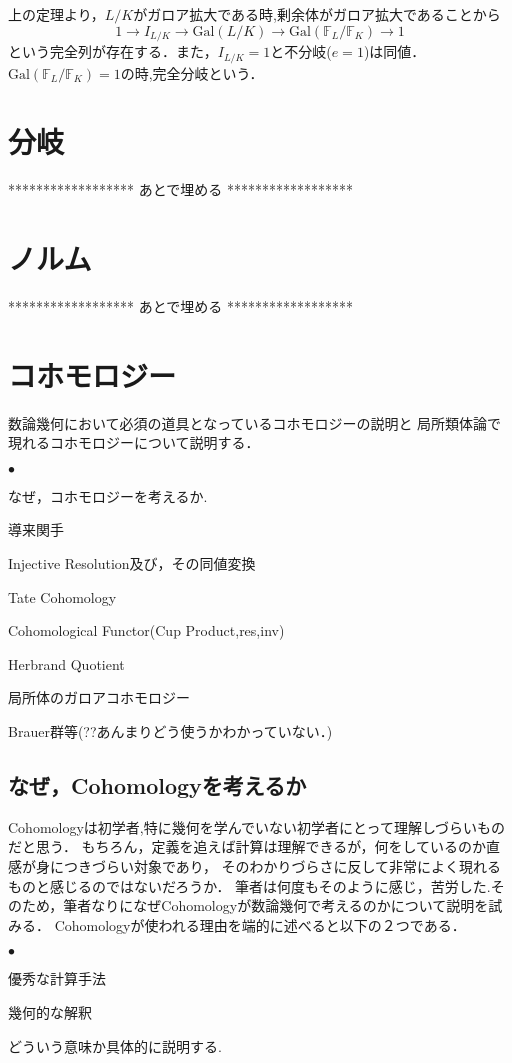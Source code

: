 \documentclass{ujarticle}
\renewenvironment{itemize}%
{%
   \begin{list}{\parbox{1zw}{$\bullet$}}%
   {%
      \setlength{\topsep}{0zh}
      \setlength{\itemindent}{0zw}
      \setlength{\leftmargin}{2zw}%
      \setlength{\rightmargin}{0zw}%
      \setlength{\labelsep}{1zw}%
      \setlength{\labelwidth}{3zw}%
      \setlength{\itemsep}{0em}%
      \setlength{\parsep}{0em}%
      \setlength{\listparindent}{0zw}%
   }
}{%
   \end{list}%
}
\begin{document}
上の定理より，$L/K$がガロア拡大である時,剰余体がガロア拡大であることから
\begin{equation}
  1 \to I_{L/K} \to \mathrm{Gal}(L/K) \to \mathrm{Gal}(\mathbb{F}_L/\mathbb{F}_K) \to 1
\end{equation}
という完全列が存在する．また，$I_{L/K}=1$と不分岐($e = 1$)は同値．
$\mathrm{Gal}(\mathbb{F}_L/\mathbb{F}_K) =1$の時,完全分岐という．

\section{分岐}
\label{sec:分岐}
******************
 あとで埋める
******************
\section{ノルム}
\label{sec:ノルム}
******************
 あとで埋める
******************


\section{コホモロジー}
\label{sec:コホモロジー}
数論幾何において必須の道具となっているコホモロジーの説明と
局所類体論で現れるコホモロジーについて説明する．
\begin{itemize}
  \item なぜ，コホモロジーを考えるか.
  \item 導来関手
  \item Injective Resolution及び，その同値変換
  \item Tate Cohomology
  \item Cohomological Functor(Cup Product,res,inv)
  \item Herbrand Quotient
  \item 局所体のガロアコホモロジー
  \item Brauer群等(??あんまりどう使うかわかっていない．)
\end{itemize}
\subsection{なぜ，Cohomologyを考えるか}
\label{sub:なぜ，Cohomologyを考えるか}
Cohomologyは初学者,特に幾何を学んでいない初学者にとって理解しづらいものだと思う．
もちろん，定義を追えば計算は理解できるが，何をしているのか直感が身につきづらい対象であり，
そのわかりづらさに反して非常によく現れるものと感じるのではないだろうか．
筆者は何度もそのように感じ，苦労した.そのため，筆者なりになぜCohomologyが数論幾何で考えるのかについて説明を試みる．
Cohomologyが使われる理由を端的に述べると以下の２つである．
\begin{itemize}
  \item 優秀な計算手法
  \item 幾何的な解釈
\end{itemize}
どういう意味か具体的に説明する.
\end{document}
